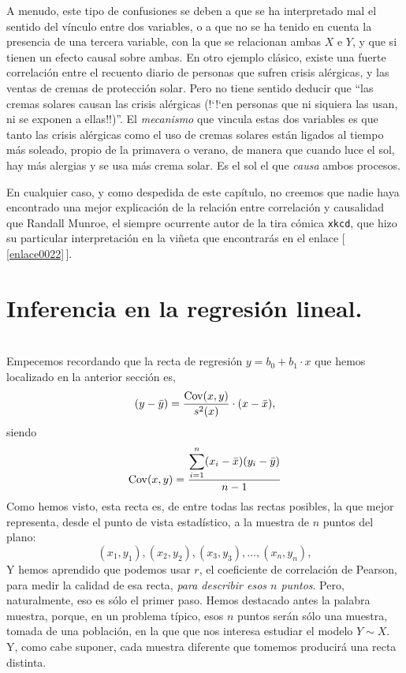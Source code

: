 A menudo, este tipo de confusiones se deben a que se ha interpretado mal el sentido del vínculo entre dos variables, o a que no se ha tenido en cuenta la presencia de una tercera variable, con la que se relacionan ambas $X$ e $Y$, y que si tienen un efecto causal sobre ambas. En otro ejemplo clásico, existe una fuerte correlación entre el recuento diario de personas que sufren crisis alérgicas, y las ventas de cremas de protección solar. Pero no tiene sentido deducir que ``las cremas solares causan las crisis alérgicas ({!`}{!`}en personas que ni siquiera las usan, ni se exponen a ellas!!)''. El {\em mecanismo} que vincula estas dos variables es que tanto las crisis alérgicas como el uso de cremas solares están ligados al tiempo más soleado, propio de la primavera o verano, de manera que cuando luce el sol, hay más alergias y se usa más crema solar. Es el sol el que {\em causa} ambos procesos.

En cualquier caso, y como despedida de este capítulo, no creemos que nadie haya encontrado una
mejor explicación de la relación entre correlación y causalidad que Randall Munroe, el siempre
ocurrente autor de la tira cómica {\tt xkcd}, que hizo su particular interpretación en la viñeta
que encontrarás en el enlace [\,\ref{enlace0022}\,]\label{enlace0022a}.


\section{Inferencia en la regresión lineal.}
\label{cap10:sec:InferenciaRegresionLineal}
\\


Empecemos recordando que la recta de regresión $y=b_0+b_1\cdot x$ que hemos localizado en
la anterior sección es,
 \[ (y-\bar y)= \dfrac{\mathrm{Cov}(x,y)} {s^2(x)}\cdot (x-\bar x),\]
siendo
\[\mathrm{Cov}(x,y)=\dfrac{\displaystyle\sum_{i=1}^{n}(x_i-\bar x)(y_i-\bar y)}{n-1}\]
Como hemos visto, esta recta es, de entre todas las rectas posibles, la que mejor representa, desde el punto de vista estadístico, a la {\sf muestra} de $n$ puntos del plano:
    \[(x_1,y_1),(x_2,y_2),(x_3,y_3),\ldots,(x_n,y_n),\]
Y hemos aprendido que podemos usar $r$, el coeficiente de correlación de Pearson, para medir la
calidad de esa recta, {\em para describir esos $n$ puntos}. Pero, naturalmente, eso es sólo el
primer paso. Hemos destacado antes la palabra muestra, porque, en un problema típico, esos $n$
puntos serán sólo una muestra, tomada de una población, en la que que nos interesa estudiar el
modelo $Y \sim X$. Y, como  cabe suponer, cada muestra diferente que tomemos producirá una recta
distinta.

